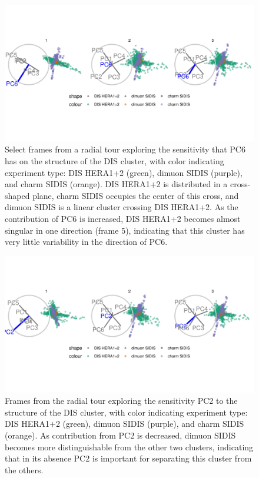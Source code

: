 \documentclass{template/monashthesis}
\begin{document}
\begin{figure}

{\centering \includegraphics[width=1\linewidth,]{./figures_from_script/ch3_fig6_DIS_better_pc6} 

}

\caption{Select frames from a radial tour exploring the sensitivity that PC6 has on the structure of the DIS cluster, with color indicating experiment type: DIS HERA1+2 (green), dimuon SIDIS (purple), and charm SIDIS (orange). DIS HERA1+2 is distributed in a cross-shaped plane, charm SIDIS occupies the center of this cross, and dimuon SIDIS is a linear cluster crossing DIS HERA1+2. As the contribution of PC6 is increased, DIS HERA1+2 becomes almost singular in one direction (frame 5), indicating that this cluster has very little variability in the direction of PC6.}\label{fig:ch3fig6}
\end{figure}

\begin{figure}

{\centering \includegraphics[width=1\linewidth,]{./figures_from_script/ch3_fig7_DIS_worse_pc2} 

}

\caption{Frames from the radial tour exploring the sensitivity PC2 to the structure of the DIS cluster, with color indicating experiment type: DIS HERA1+2 (green), dimuon SIDIS (purple), and charm SIDIS (orange). As contribution from PC2 is decreased, dimuon SIDIS becomes more distinguishable from the other two clusters, indicating that in its absence PC2 is important for separating this cluster from the others.}\label{fig:ch3fig7}
\end{figure}
\end{document}
